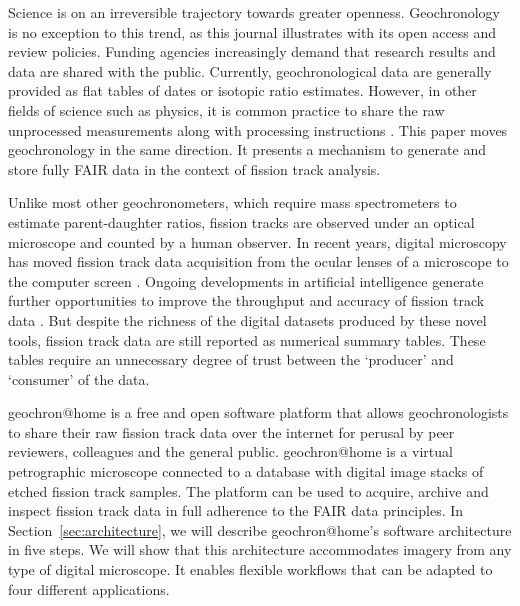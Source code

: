 \documentclass[gchron, manuscript]{copernicus}
\begin{document}
\introduction\label{sec:intro}

Science is on an irreversible trajectory towards greater
openness. Geochronology is no exception to this trend, as this journal
illustrates with its open access and review policies. Funding agencies
increasingly demand that research results and data are shared with the
public. Currently, geochronological data are generally provided as
flat tables of dates or isotopic ratio estimates. However, in other
fields of science such as physics, it is common practice to share the
raw unprocessed measurements along with processing instructions
\citep[e.g.,][]{abbott2016}. This paper moves geochronology in the
same direction. It presents a mechanism to generate and store fully
FAIR \citep[Findable, Accessible, Interoperable and
  Reproducible;][]{wilkinson2016} data in the context of fission track
analysis.\medskip

Unlike most other geochronometers, which require mass spectrometers to
estimate parent-daughter ratios, fission tracks are observed under an
optical microscope and counted by a human observer.  In recent years,
digital microscopy has moved fission track data acquisition from the
ocular lenses of a microscope to the computer screen
\citep{gleadow2009, gleadow2019, vanranst2020}. Ongoing developments
in artificial intelligence generate further opportunities to improve
the throughput and accuracy of fission track data
\citep{nachtergaele2021,li2022,ren2023,boone2025}. But despite the
richness of the digital datasets produced by these novel tools,
fission track data are still reported as numerical summary
tables. These tables require an unnecessary degree of trust between
the `producer' and `consumer' of the data.\medskip

geochron@home is a free and open software platform that allows
geochronologists to share their raw fission track data over the
internet for perusal by peer reviewers, colleagues and the general
public. geochron@home is a virtual petrographic microscope connected to a
database with digital image stacks of etched fission track
samples. The platform can be used to acquire, archive and inspect
fission track data in full adherence to the FAIR data principles. In
Section~\ref{sec:architecture}, we will describe geochron@home's software
architecture in five steps. We will show that this architecture
accommodates imagery from any type of digital microscope. It enables
flexible workflows that can be adapted to four different
applications.\medskip
\end{document}
